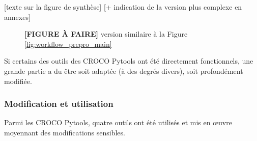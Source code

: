 \documentclass[10pt,a4paper,titlepage]{article}
\begin{document}
\alert{[texte sur la figure de synthèse]
    [+ indication de la version plus complexe en annexes]}
\begin{figure}[H]
    \centering
    \caption{
        \textbf{[FIGURE À FAIRE]}
        version similaire à la Figure \ref{fig:workflow_prepro_main}
    }
    \label{fig:workflow_prepro_original}
\end{figure}

Si certains des outils des CROCO Pytools ont été directement fonctionnels, une grande partie a du être soit adaptée (à des degrés divers), soit profondément modifiée.

\subsubsection{Modification et utilisation}

Parmi les CROCO Pytools, quatre outils ont été utilisés et mis en \oe{uvre} moyennant des modifications sensibles.
\end{document}
